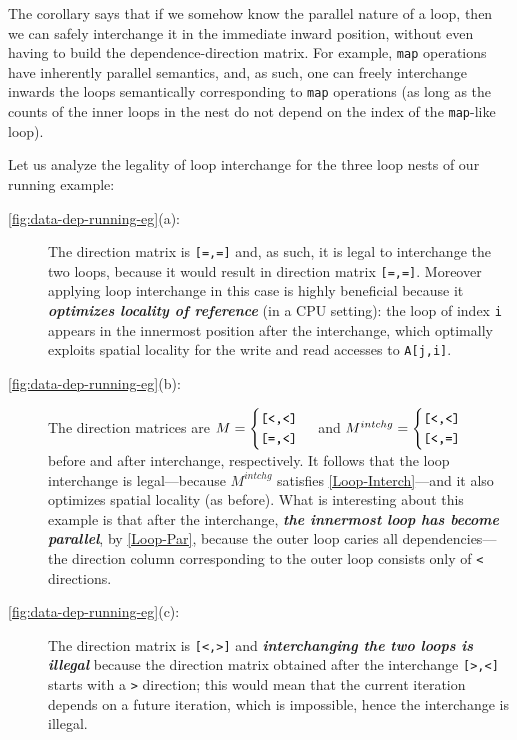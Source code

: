 \documentclass[acmsmall,review]{acmart}\settopmatter{printfolios=true,printccs=false,printacmref=false}
\begin{document}
The corollary says that if we somehow know the parallel nature
of a loop, then we can safely interchange it in the immediate inward 
position, without even having to build the dependence-direction matrix.
For example, \lstinline{map} operations have inherently parallel
semantics, and, as such, one can freely interchange inwards the
loops semantically corresponding to \lstinline{map} operations
(as long as the counts of the inner loops in the nest do not
depend on the index of the \lstinline{map}-like loop).

Let us analyze the legality of loop interchange for the three loop 
nests of our running example:
\begin{description}
\item[\cref{fig:data-dep-running-eg}(a):] The direction matrix
        is {\tt [=,=]} and, as such, it is legal to interchange
        the two loops, because it would result in direction
        matrix {\tt[=,=]}. Moreover applying loop interchange
        in this case is highly beneficial because it
        \textbf{\em optimizes locality of reference} (in a CPU setting): the 
        loop of index {\tt i} appears in the innermost position 
        after the interchange, which optimally exploits spatial 
        locality for the write and read accesses to {\tt A[j,i]}.
\item[\cref{fig:data-dep-running-eg}(b):] The direction matrices are
        $M = \begin{cases}\mbox{\tt[<,<]}\\\mbox{\tt[=,<]}\end{cases}$
        and
        $M^{intchg} = \begin{cases}\mbox{\tt[<,<]}\\\mbox{\tt[<,=]}\end{cases}$
        before and after interchange, respectively. 
        It follows that the loop interchange is legal---because 
        $M^{intchg}$ satisfies \cref{Loop-Interch}---and 
        it also optimizes spatial locality (as before).
        What is interesting about this example is that after the 
        interchange, \textbf{\em the innermost loop has become parallel},
        by \cref{Loop-Par}, because the outer loop caries
        all dependencies---the direction column corresponding to the
        outer loop consists only of {\tt<} directions.
\item[\cref{fig:data-dep-running-eg}(c):] The direction matrix is
        {\tt[<,>]} and \textbf{\em interchanging the two loops is illegal}
        because the direction matrix obtained after the interchange
        {\tt[>,<]} starts with a {\tt>} direction; this would
        mean that the current iteration depends on a future iteration,
        which is impossible, hence the interchange is illegal.
\end{description}
\end{document}
